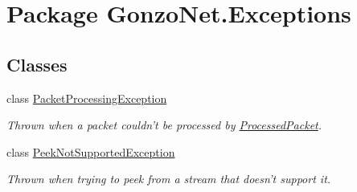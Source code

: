 \hypertarget{namespace_gonzo_net_1_1_exceptions}{\section{Package Gonzo\+Net.\+Exceptions}
\label{namespace_gonzo_net_1_1_exceptions}
}
\subsection*{Classes}
\begin{DoxyCompactItemize}
\item 
class \hyperlink{class_gonzo_net_1_1_exceptions_1_1_packet_processing_exception}{Packet\+Processing\+Exception}
\begin{DoxyCompactList}\small\item\em Thrown when a packet couldn't be processed by \hyperlink{class_gonzo_net_1_1_processed_packet}{Processed\+Packet}. \end{DoxyCompactList}\item 
class \hyperlink{class_gonzo_net_1_1_exceptions_1_1_peek_not_supported_exception}{Peek\+Not\+Supported\+Exception}
\begin{DoxyCompactList}\small\item\em Thrown when trying to peek from a stream that doesn't support it. \end{DoxyCompactList}\end{DoxyCompactItemize}
